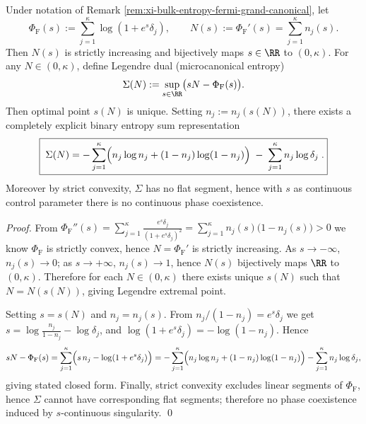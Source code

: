 \begin{proposition}\label{prop:xi-bulk-entropy-microcanonical-legendre-dual}
Under notation of Remark \ref{rem:xi-bulk-entropy-fermi-grand-canonical}, let
\[
\Phi_{\mathrm{F}}(s):=\sum_{j=1}^{\kappa}\log(1+e^s\delta_j),
\qquad
N(s):=\Phi_{\mathrm{F}}'(s)=\sum_{j=1}^{\kappa}n_j(s).
\]
Then \(N(s)\) is strictly increasing and bijectively maps \(s\in\RR\) to \((0,\kappa)\).
For any \(N\in(0,\kappa)\), define Legendre dual (microcanonical entropy)
\[
\Sigma(N):=\sup_{s\in\RR}\bigl(sN-\Phi_{\mathrm{F}}(s)\bigr).
\]
Then optimal point \(s(N)\) is unique.
Setting \(n_j:=n_j(s(N))\), there exists a completely explicit binary entropy sum representation
\[
\boxed{\;
\Sigma(N)= -\sum_{j=1}^{\kappa}\Bigl(n_j\log n_j+(1-n_j)\log(1-n_j)\Bigr)\;-\;\sum_{j=1}^{\kappa}n_j\log\delta_j\;.}
\]
Moreover by strict convexity, \(\Sigma\) has no flat segment, hence with \(s\) as continuous control parameter there is no continuous phase coexistence.
\end{proposition}
\begin{proof}
From
\(
\Phi_{\mathrm{F}}''(s)=\sum_{j=1}^{\kappa}\frac{e^s\delta_j}{(1+e^s\delta_j)^2}
=\sum_{j=1}^{\kappa}n_j(s)\bigl(1-n_j(s)\bigr)>0
\)
we know \(\Phi_{\mathrm{F}}\) is strictly convex, hence \(N=\Phi_{\mathrm{F}}'\) is strictly increasing.
As \(s\to-\infty\), \(n_j(s)\to 0\); as \(s\to+\infty\), \(n_j(s)\to 1\), hence \(N(s)\) bijectively maps \(\RR\) to \((0,\kappa)\).
Therefore for each \(N\in(0,\kappa)\) there exists unique \(s(N)\) such that \(N=N(s(N))\), giving Legendre extremal point.
\par
Setting \(s=s(N)\) and \(n_j=n_j(s)\).
From \(n_j/(1-n_j)=e^s\delta_j\) we get
\(
s=\log\frac{n_j}{1-n_j}-\log\delta_j
\),
and
\(
\log(1+e^s\delta_j)=-\log(1-n_j)
\).
Hence
\[
sN-\Phi_{\mathrm{F}}(s)
=\sum_{j=1}^{\kappa}\Bigl(s\,n_j-\log(1+e^s\delta_j)\Bigr)
=-\sum_{j=1}^{\kappa}\Bigl(n_j\log n_j+(1-n_j)\log(1-n_j)\Bigr)-\sum_{j=1}^{\kappa}n_j\log\delta_j,
\]
giving stated closed form.
Finally, strict convexity excludes linear segments of \(\Phi_{\mathrm{F}}\), hence \(\Sigma\) cannot have corresponding flat segments; therefore no phase coexistence induced by \(s\)-continuous singularity. \qed
\end{proof}





